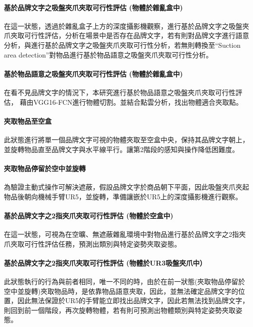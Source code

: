 \paragraph{基於品牌文字之吸盤夾爪夾取可行性評估 (物體於雜亂盒中)}
在這一狀態，透過於雜亂盒子上方的深度攝影機觀察，進行基於品牌文字之吸盤夾爪夾取可行性評估，分析在場景中是否存在品牌文字，若有則對品牌文字進行語意分析，與進行基於品牌文字之吸盤夾爪夾取可行性分析，若無則轉換至``Suction area detection''對物品進行基於物品語意之吸盤夾爪夾取可行性分析。

\paragraph{基於物品語意之吸盤夾爪夾取可行性評估 (物體於雜亂盒中)}

在看不見品牌文字的情況下，本研究進行基於物品語意之吸盤夾爪夾取可行性評估，
藉由VGG16-FCN進行物體切割。並結合點雲分析，找出物體適合夾取點。

\paragraph{夾取物品至空盒}
此狀態進行將單一個品牌文字可視的物體夾取至空盒中央，保持其品牌文字朝上，並旋轉物品直至品牌文字與水平線平行。讓第2階段的感知與操作降低困難度。

\paragraph{夾取物品停留於空中並旋轉}
為驗證主動式操作可解決遮蔽，假設品牌文字於商品朝下平面，因此吸盤夾爪夾起物品後朝向機械手臂UR5，並旋轉，準備讓嵌於UR5上的深度攝影機進行觀察。

\paragraph{基於品牌文字之2指夾爪夾取可行性評估 (物體於空盒中)}
在這一狀態，可視為在空曠、無遮蔽雜亂環境中對物品進行基於品牌文字之2指夾爪夾取可行性評估任務，預測出類別與特定姿勢夾取姿態。

\paragraph{基於品牌文字之2指夾爪夾取可行性評估 (物體於UR3吸盤夾爪中）}
此狀態執行的行為與前者相同，唯一不同的時，由於在前一狀態(夾取物品停留於空中並旋轉)夾取物品時，是依靠物品語意夾取，因此，並無法確定品牌文字的位置，因此無法保證於UR5的手臂能立即找出品牌文字，因此若無法找到品牌文字，則回到前一個階段，再次旋轉物體，若有則可預測出物體類別與特定姿勢夾取姿態。

